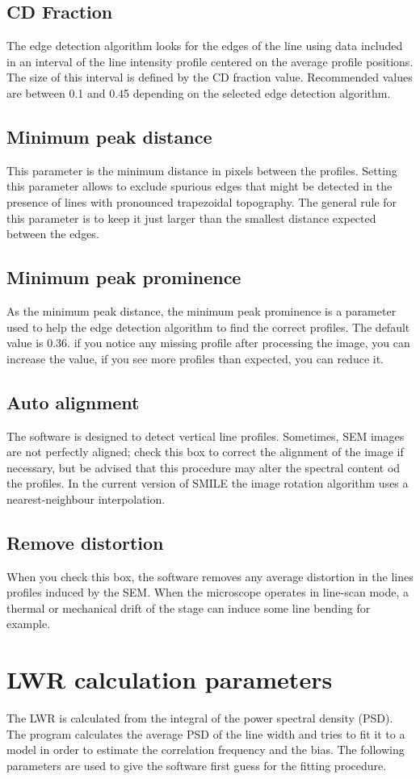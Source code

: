 \documentclass[12pt, a4paper, openany]{report}
\begin{document}
\subsection{CD Fraction}
The edge detection algorithm looks for the edges of the line using data included in an interval of the line intensity profile centered on the average profile positions. The size of this interval is defined by the CD fraction value. Recommended values are between 0.1 and 0.45 depending on the selected edge detection algorithm.
\subsection{Minimum peak distance}
This parameter is the minimum distance in pixels between the profiles. Setting this parameter allows to exclude spurious edges that might be detected in the presence of lines with pronounced trapezoidal topography. The general rule for this parameter is to keep it just larger than the smallest distance expected between the edges.
\subsection{Minimum peak prominence}
As the minimum peak distance, the minimum peak prominence is a parameter used to help the edge detection algorithm to find the correct profiles. The default value is 0.36. if you notice any missing profile after processing the image, you can increase the value, if you see more profiles than expected, you can reduce it. 
\subsection{Auto alignment}
The software is designed to detect vertical line profiles. Sometimes, SEM images are not perfectly aligned; check this box to correct the alignment of the image if necessary, but be advised that this procedure may alter the spectral content od the profiles. In the current version of SMILE the image rotation algorithm uses a nearest-neighbour interpolation.
\subsection{Remove distortion}
When you check this box, the software removes any average distortion in the lines profiles induced by the SEM. When the microscope operates in line-scan mode, a thermal or mechanical drift of the stage can induce some line bending for example.
\section{LWR calculation parameters}
The LWR is calculated from the integral of the power spectral density (PSD). The program calculates the average PSD of the line width and tries to fit it to a model in order to estimate the correlation frequency and the bias. The following parameters are used to give the software first guess for the fitting procedure.
\end{document}
